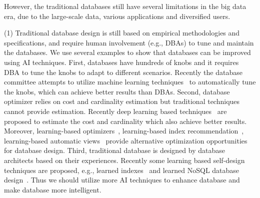 
However, the traditional databases still have several limitations in the big data era, due to the large-scale data, various applications and diversified users.

(1) Traditional database design is still based on empirical methodologies and specifications, and require human involvement (e.g., DBAs) to tune and  maintain the databases. We use several examples to show that databases can be improved using AI techniques. First, databases have hundreds of knobs and it requires DBA to tune the knobs to adapt to different scenarios. Recently the database committee attempts to utilize machine learning techniques~\cite{DBLP:conf/sigmod/AkenPGZ17, DBLP:conf/vldb/qtune19,  DBLP:conf/sigmod/cdbtune19} to automatically tune the knobs, which can achieve better results than DBAs. Second, database optimizer relies on cost and cardinality estimation but traditional techniques cannot provide estimation. Recently deep learning based techniques~\cite{DBLP:conf/cidr/KipfKRLBK19, DBLP:conf/sigmod/OrtizBGK18} are proposed to estimate the cost and cardinality which also achieve better results. Moreover, learning-based optimizers~\cite{DBLP:journals/corr/abs-1808-03196, DBLP:conf/sigmod/MarcusP18}, learning-based  index recommendation~\cite{DBLP:conf/hais/PedrozoNR18}, learning-based automatic views~\cite{DBLP:journals/corr/abs-1903-01363} provide alternative optimization opportunities for database design. Third, traditional database is designed by database  architects based on their experiences. Recently some learning based self-design techniques are proposed, e.g., learned indexes~\cite{DBLP:conf/sigmod/KraskaBCDP18} and learned NoSQL database design~\cite{DBLP:conf/cidr/IdreosDQAHRLJGL19}. Thus we should utilize more AI techniques to enhance database and make database more intelligent.      


